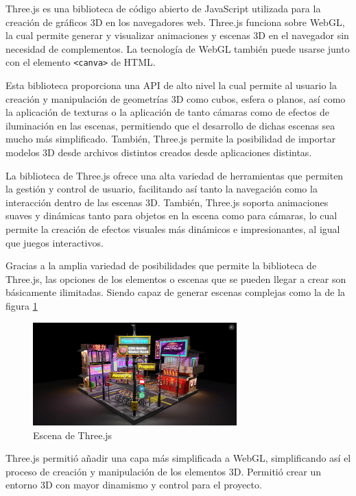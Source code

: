 \documentclass[a4paper, 12pt]{book}
\begin{document}
Three.js \cite{webdev_three_intro} es una biblioteca de código abierto de JavaScript utilizada para la creación de gráficos 3D en los navegadores web. Three.js funciona sobre WebGL, la cual permite generar y visualizar animaciones y escenas 3D en el navegador sin necesidad de complementos. La tecnología de WebGL también puede usarse junto con el elemento \texttt{<canva>} de HTML.

Esta biblioteca proporciona una API de alto nivel la cual permite al usuario la creación y manipulación de geometrías 3D como cubos, esfera o planos, así como la aplicación de texturas o la aplicación de tanto cámaras como de efectos de iluminación en las escenas, permitiendo que el desarrollo de dichas escenas sea mucho más simplificado. 
También, Three.js permite la posibilidad de importar modelos 3D desde archivos distintos creados desde aplicaciones distintas.

La biblioteca de Three.js ofrece una alta variedad de herramientas que permiten la gestión y control de usuario, facilitando así tanto la navegación como la interacción dentro de las escenas 3D. También, Three.js soporta animaciones suaves y dinámicas tanto para objetos en la escena como para cámaras, lo cual permite la creación de efectos visuales más dinámicos e impresionantes, al igual que juegos interactivos. 

Gracias a la amplia variedad de posibilidades que permite la biblioteca de Three.js, las opciones de los elementos o escenas que se pueden llegar a crear son básicamente ilimitadas. Siendo capaz de generar escenas complejas como la de la figura \ref{fig:three}
\begin{figure}[H] 
  \centering
  \includegraphics[width=0.7\textwidth]{img/three.jpeg}
  \caption{Escena de Three.js}
  \label{fig:three}
\end{figure}

Three.js permitió añadir una capa más simplificada a WebGL, simplificando así el proceso de creación y manipulación de los elementos 3D. Permitió crear un entorno 3D con mayor dinamismo y control para el proyecto.
\end{document}
